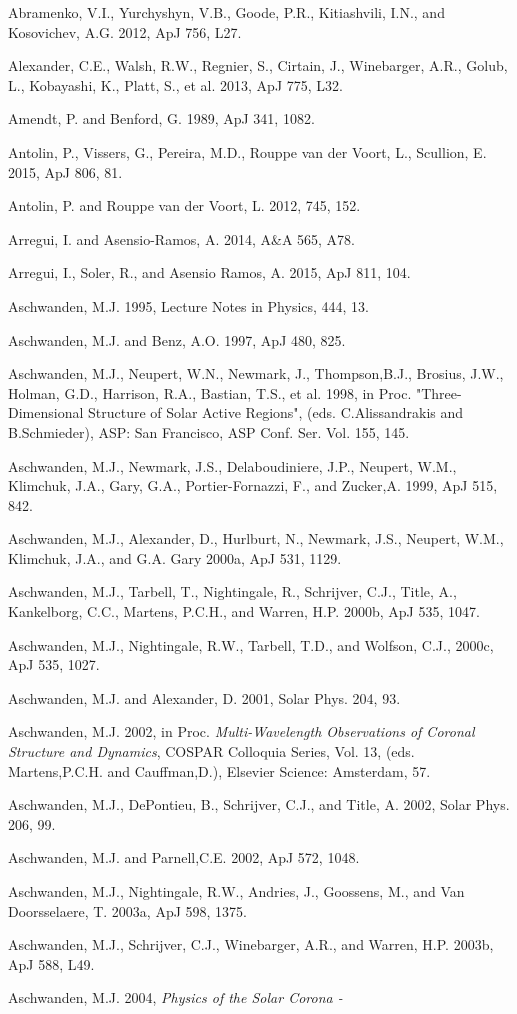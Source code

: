 \documentclass[10pt,preprint]{aastex}  %
\begin{document}
\begin{references} %

\def\ref#1{\par\noindent{} {#1}}
\small

\ref{Abramenko, V.I., Yurchyshyn, V.B., Goode, P.R., Kitiashvili, I.N.,
	and Kosovichev, A.G. 2012, ApJ 756, L27.}
\ref{Alexander, C.E., Walsh, R.W., Regnier, S., Cirtain, J., 
	Winebarger, A.R., Golub, L., Kobayashi, K., Platt, S., et al.
 	2013, ApJ 775, L32.}
\ref{Amendt, P. and Benford, G. 1989, ApJ 341, 1082.}
\ref{Antolin, P., Vissers, G., Pereira, M.D., Rouppe van der Voort, L.,
	Scullion, E. 2015, ApJ 806, 81.}
\ref{Antolin, P. and Rouppe van der Voort, L. 2012, 745, 152.}
\ref{Arregui, I. and Asensio-Ramos, A. 2014, A\&A 565, A78.}
\ref{Arregui, I., Soler, R., and Asensio Ramos, A. 2015, ApJ 811, 104.}
\ref{Aschwanden, M.J. 1995, Lecture Notes in Physics, 444, 13.}
\ref{Aschwanden, M.J. and Benz, A.O. 1997, ApJ 480, 825.}
\ref{Aschwanden, M.J., Neupert, W.N., Newmark, J., Thompson,B.J., 
	Brosius, J.W., Holman, G.D., Harrison, R.A., Bastian, T.S., et al.
        1998, in Proc. "Three-Dimensional Structure of Solar Active Regions", 
	(eds. C.Alissandrakis and B.Schmieder), ASP: San Francisco, 
	ASP Conf. Ser. Vol. 155, 145.}
\ref{Aschwanden, M.J., Newmark, J.S., Delaboudiniere, J.P., Neupert, W.M., 
	Klimchuk, J.A., Gary, G.A., Portier-Fornazzi, F., and Zucker,A.
 	1999, ApJ 515, 842.}
\ref{Aschwanden, M.J., Alexander, D., Hurlburt, N., Newmark, J.S., 
	Neupert, W.M., Klimchuk, J.A., and G.A. Gary 2000a, ApJ 531, 1129.}
\ref{Aschwanden, M.J., Tarbell, T., Nightingale, R., Schrijver, C.J., 
	Title, A., Kankelborg, C.C., Martens, P.C.H., and Warren, H.P.
 	2000b, ApJ 535, 1047.}
\ref{Aschwanden, M.J., Nightingale, R.W., Tarbell, T.D., and Wolfson, C.J.,
	2000c, ApJ 535, 1027.}
\ref{Aschwanden, M.J. and Alexander, D. 2001, Solar Phys. 204, 93.}
\ref{Aschwanden, M.J. 2002, in Proc. {\sl Multi-Wavelength Observations 
	of Coronal Structure and Dynamics}, COSPAR Colloquia Series, Vol. 13, 
	(eds. Martens,P.C.H. and Cauffman,D.), Elsevier Science: Amsterdam, 57.}
\ref{Aschwanden, M.J., DePontieu, B., Schrijver, C.J., and Title, A.
 	2002, Solar Phys. 206, 99.}
\ref{Aschwanden, M.J. and Parnell,C.E. 2002, ApJ 572, 1048.}
\ref{Aschwanden, M.J., Nightingale, R.W., Andries, J., Goossens, M., 
	and Van Doorsselaere, T. 2003a, ApJ 598, 1375.}
\ref{Aschwanden, M.J., Schrijver, C.J., Winebarger, A.R., and Warren, H.P.
	2003b, ApJ 588, L49.}
\ref{Aschwanden, M.J. 2004, {\sl Physics of the Solar Corona - 
}}
\end{references}
\end{document}
